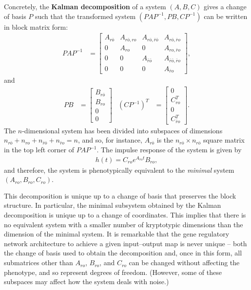 \documentclass{article}
\newcommand{\ro}{{ro}}
\newcommand{\nro}{{\bar{r}o}}
\newcommand{\rno}{{r\bar{o}}}
\newcommand{\nrno}{{\bar{r}\bar{o}}}
\newcommand{\1}{\mathbbm{1}}
\begin{document}
Concretely, the \textbf{Kalman decomposition} of a system $(A,B,C)$  
gives a change of basis $P$ such that
the transformed system $(PAP^{-1},PB,CP^{-1})$
can be written in block matrix form:
\begin{align*}
       PAP^{-1}
       &=
       \left[ \begin{array}{cccc}
           A_{\rno} & A_{\rno,\ro} & A_{\rno,\nrno} & A_{\rno,\nro} \\
           0 & A_{\ro} & 0 & A_{\ro,\nro} \\
           0 & 0 & A_{\nrno} & A_{\nrno,\nro} \\
          0 & 0 & 0 & A_{\nro}
       \end{array} \right] ,
\end{align*}
and
\begin{align*}
     PB
     &=
    \left[ \begin{array}{cccc}
         B_{\rno} \\
         B_{\ro} \\
         0 \\
         0 
   \end{array} \right] 
   &
   (CP^{-1})^T
   &=
   \left[ \begin{array}{cccc}
       0 \\
       C_{\ro}^T \\
       0 \\
       C_{\nro}^T
   \end{array} \right] .
\end{align*}
The $n$-dimensional system has been divided into subspaces
of dimensions $n_\rno + n_\ro + n_\nrno + n_\nro = n$,
and so, for instance, $A_{\rno}$ is the $n_\rno \times n_\rno$ square matrix 
in the top left corner of $P A P^{-1}$. 
The impulse response of the system is given by
\begin{align*}
      h(t) = C_{\ro} e^{A_{\ro} t} B_{\ro},
\end{align*}
and therefore, the system is phenotypically equivalent to the \emph{minimal} system $(A_{\ro}, B_{\ro}, C_{\ro})$.

This decomposition is unique up to a change of basis that preserves the block structure.
In particular, 
the minimal subsystem obtained by the Kalman decomposition
is unique up to a change of coordinates.
This implies that there is no equivalent system with a smaller number of kryptotypic dimensions
than the dimension of the minimal system.
It is remarkable that the gene regulatory network architecture to achieve a given input--output map is never unique --
both the change of basis used to obtain the decomposition
and, once in this form, all submatrices other than $A_{\ro}$, $B_{\ro}$, and $C_{\ro}$ can be changed without affecting the phenotype,
and so represent degrees of freedom.
(However, some of these subspaces may affect how the system deals with noise.)
\end{document}
